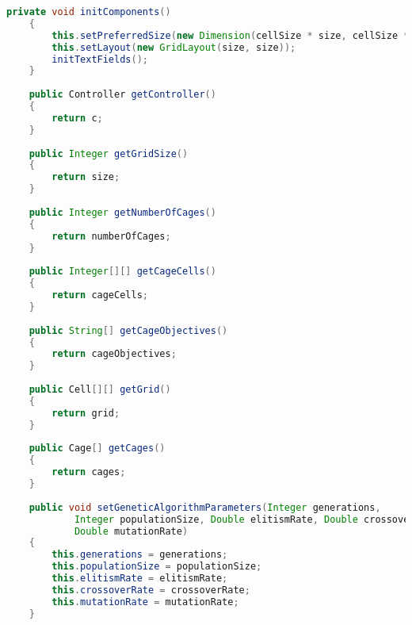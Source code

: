 \begin{lstlisting}[language=Java,basicstyle=\tiny,caption=GUI.java]
    private void initComponents()
    {
        this.setPreferredSize(new Dimension(cellSize * size, cellSize * size));
        this.setLayout(new GridLayout(size, size));
        initTextFields();
    }
    
    public Controller getController()
    {
        return c;
    }
    
    public Integer getGridSize()
    {
        return size;
    }
    
    public Integer getNumberOfCages()
    {
        return numberOfCages;
    }
    
    public Integer[][] getCageCells()
    {
        return cageCells;
    }
    
    public String[] getCageObjectives()
    {
        return cageObjectives;
    }
    
    public Cell[][] getGrid()
    {
        return grid;
    }
    
    public Cage[] getCages()
    {
        return cages;
    }
    
    public void setGeneticAlgorithmParameters(Integer generations, 
            Integer populationSize, Double elitismRate, Double crossoverRate, 
            Double mutationRate)
    {
        this.generations = generations;
        this.populationSize = populationSize;
        this.elitismRate = elitismRate;
        this.crossoverRate = crossoverRate;
        this.mutationRate = mutationRate;
    }
    

\end{lstlisting}
